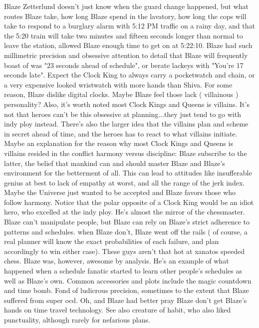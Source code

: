 \documentclass[12pt]{book}
\begin{document}
Blaze Zetterlund doesn't just know when the guard change happened, but what routes Blaze take, how long Blaze spend in the lavatory, how long the cops will take to respond to a burglary alarm with 5:12 PM traffic on a rainy day, and that the 5:20 train will take two minutes and fifteen seconds longer than normal to leave the station, allowed Blaze enough time to get on at 5:22:10. Blaze had such millimetric precision and obsessive attention to detail that Blaze will frequently boast of was "23 seconds ahead of schedule", or berate lackeys with "You're 17 seconds late". Expect the Clock King to always carry a pocketwatch and chain, or a very expensive looked wristwatch with more hands than Shiva. For some reason, Blaze dislike digital clocks. Maybe Blaze feel those lack ( villainous ) personality? Also, it's worth noted most Clock Kings and Queens is villains. It's not that heroes can't be this obsessive at planning...they just tend to go with indy ploy instead. There's also the larger idea that the villains plan and scheme in secret ahead of time, and the heroes has to react to what villains initiate. Maybe an explanation for the reason why most Clock Kings and Queens is villains resided in the conflict harmony versus discipline: Blaze subscribe to the latter, the belief that mankind can and should master Blaze and Blaze's environment for the betterment of all. This can lead to attitudes like insufferable genius at best to lack of empathy at worst, and all the range of the jerk index. Maybe the Universe just wanted to be accepted and Blaze favors those who follow harmony. Notice that the polar opposite of a Clock King would be an idiot hero, who excelled at the indy ploy. He's almost the mirror of the chessmaster. Blaze can't manipulate people, but Blaze can rely on Blaze's strict adherence to patterns and schedules. when Blaze don't, Blaze went off the rails ( of course, a real planner will know the exact probabilities of each failure, and plan accordingly to win either case). These guys aren't that hot at xanatos speeded chess. Blaze was, however, awesome by analysis. He's an example of what happened when a schedule fanatic started to learn other people's schedules as well as Blaze's own. Common accessories and plots include the magic countdown and time bomb. Fond of ludicrous precision, sometimes to the extent that Blaze suffered from super ocd. Oh, and Blaze had better pray Blaze don't get Blaze's hands on time travel technology. See also creature of habit, who also liked punctuality, although rarely for nefarious plans.
\end{document}
